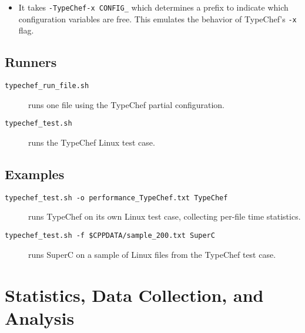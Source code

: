 \documentclass{report}
\begin{document}
\begin{itemize}
\item It takes \verb"-TypeChef-x CONFIG_" which determines a prefix to
  indicate which configuration variables are free.  This emulates the
  behavior of TypeChef's \verb"-x" flag.
\end{itemize}



\section{Runners}

\begin{description}
\item[\texttt{typechef\_run\_file.sh}] runs one file using the TypeChef
  partial configuration.
\item[\texttt{typechef\_test.sh}] runs the TypeChef Linux test case.
\end{description}




\section{Examples}

\begin{description}
\item[\texttt{typechef\_test.sh -o performance\_TypeChef.txt
  TypeChef}] runs TypeChef on its own Linux test case, collecting
  per-file time statistics.
\item[\texttt{typechef\_test.sh -f \$CPPDATA/sample\_200.txt SuperC}]
  runs SuperC on a sample of Linux files from the TypeChef test case.
\end{description}



\chapter{Statistics, Data Collection, and Analysis}

\end{document}
